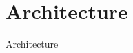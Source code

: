 \section{Architecture}

\begin{frame}{Architecture}{}
\centering
\begin{figure}
  \scalebox{0.75}{}
\end{figure}
\end{frame}


